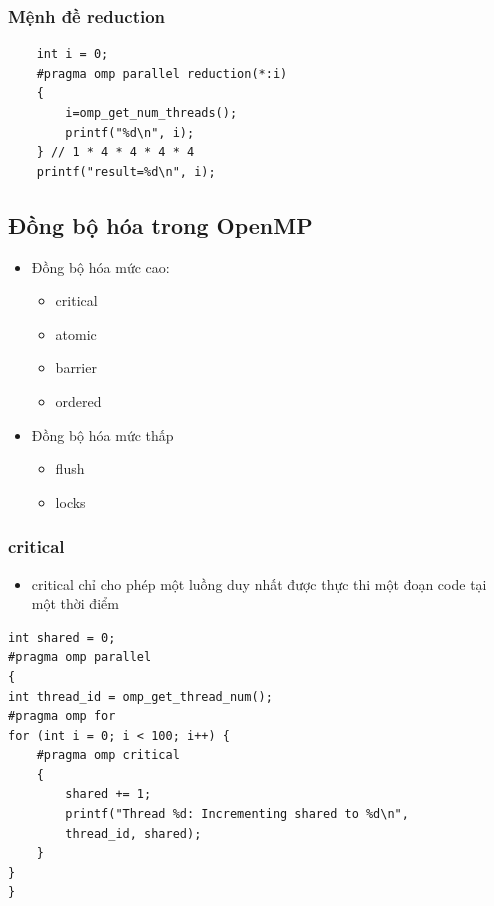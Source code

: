 \documentclass[14pt, a4paper]{article}
\numberwithin{equation}{section}
\numberwithin{figure}{section}
\numberwithin{dl}{section}
\numberwithin{md}{section}
\numberwithin{bd}{section}
\numberwithin{dn}{section}
\numberwithin{hq}{section}
\begin{document}
\subsubsection{Mệnh đề reduction}

\begin{verbatim}
    int i = 0;
    #pragma omp parallel reduction(*:i)
    {
        i=omp_get_num_threads();
        printf("%d\n", i);
    } // 1 * 4 * 4 * 4 * 4
    printf("result=%d\n", i); 
\end{verbatim}

\subsection{Đồng bộ hóa trong OpenMP}

\begin{itemize}
    \item Đồng bộ hóa mức cao:
    \begin{itemize}
        \item critical
        \item atomic 
        \item barrier
        \item ordered
    \end{itemize}
    \item Đồng bộ hóa mức thấp
    \begin{itemize}
        \item flush
        \item locks
    \end{itemize}
\end{itemize}

\subsubsection{critical}

\begin{itemize}
    \item critical chỉ cho phép một luồng duy nhất được thực thi một đoạn code tại một thời điểm
\end{itemize}

\begin{verbatim}
int shared = 0;
#pragma omp parallel
{
int thread_id = omp_get_thread_num();
#pragma omp for
for (int i = 0; i < 100; i++) {
    #pragma omp critical
    {
        shared += 1;
        printf("Thread %d: Incrementing shared to %d\n", 
        thread_id, shared);
    }
}
}
\end{verbatim}
\end{document}
